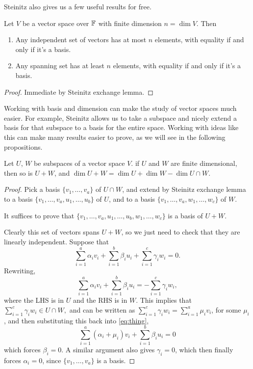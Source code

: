 \documentclass[a4paper]{scrartcl}
\begin{document}
Steinitz also gives us a few useful results for free.

\begin{corollary}
    Let $V$ be a vector space over $\mathbb{F}$ with finite dimension $n = \dim V$. Then
    \begin{enumerate}[label=(\roman*)]
        \item Any independent set of vectors has at most $n$ elements, with equality if and only if it's a basis.
        \item Any spanning set has at least $n$ elements, with equality if and only if it's a basis.
    \end{enumerate} 
\end{corollary}
\begin{proof}
    Immediate by Steinitz exchange lemma.
\end{proof}

Working with basis and dimension can make the study of vector spaces much easier. For example, Steinitz allows us to take a subspace and nicely extend a basis for that subspace to a basis for the entire space. Working with ideas like this can make many results easier to prove, as we will see in the following propositions.


\begin{proposition}
    Let $U$, $W$ be subspaces of a vector space $V$. if $U$ and $W$ are finite dimensional, then so is $U + W$, and $\dim U + W = \dim U + \dim W - \dim U \cap W$.
\end{proposition}
\begin{proof}
    Pick a basis $\{v_1, \dots, v_a\}$ of $U \cap W$, and extend by Steinitz exchange lemma to a basis $\{v_1, \dots, v_a, u_1, \dots, u_b\}$ of $U$, and to a basis $\{v_1, \dots, v_a, w_1, \dots, w_c\}$ of $W$.
    
    It suffices to prove that $\{v_1, \dots, v_a, u_1, \dots, u_b, w_1, \dots, w_c\}$ is a basis of $U + W$.

    Clearly this set of vectors spans $U + W$, so we just need to check that they are linearly independent. Suppose that
    $$
    \sum_{i = 1}^{a} \alpha_i v_i + \sum_{i = 1}^b \beta_i u_i + \sum_{i = 1}^c \gamma_i w_i = 0.
    $$
    Rewriting,
    \begin{equation}\label{eq:thing}
        \sum_{i = 1}^{a} \alpha_i v_i + \sum_{i = 1}^b \beta_i u_i = -\sum_{i = 1}^c \gamma_i w_i, \tag{$\dagger$}
    \end{equation}
    where the LHS is in $U$ and the RHS is in $W$. This implies that
    $
    \sum_{i = 1}^c \gamma_i w_i \in U \cap W,
    $
    and can be written as 
    $
    \sum_{i = 1}^c \gamma_i w_i = \sum_{i = 1}^a  \mu_i v_i$,
    for some $\mu_i$, and then substituting this back into \eqref{eq:thing},
    $$
    \sum_{i = 1}^a (\alpha_i + \mu_i) v_i + \sum_{i = 1}^b \beta_i u_i = 0
    $$
    which forces $\beta_i = 0$. A similar argument also gives $\gamma_i = 0$, which then finally forces $\alpha_i = 0$, since $\{v_1, \dots, v_a\}$ is a basis.
\end{proof}
\end{document}
